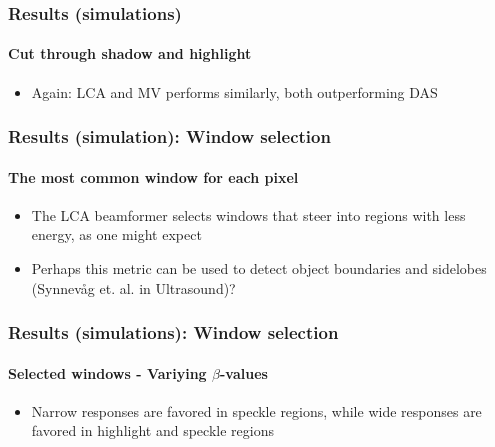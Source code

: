 \documentclass[
    beamer                                       %
 , xelatex                                      %
]{common/mytemplate}
\begin{document}
\begin{frame}
\frametitle{Results (simulations)}
\framesubtitle{Cut through shadow and highlight}
\parbox{0.55\linewidth}{
\begin{itemize}
\item Again: LCA and MV performs similarly, both outperforming DAS
\end{itemize}}
\vspace{-67pt}
\begin{figure}[H]
\end{figure}
\end{frame}

\begin{frame}
\frametitle{Results (simulation): Window selection}
\framesubtitle{The most common window for each pixel}
\vspace{-5pt}
\begin{figure}[H]
\end{figure}
\begin{itemize}
\item The LCA beamformer selects windows that steer into regions with less energy, as one might expect
\item Perhaps this metric can be used to detect object boundaries and sidelobes (Synnevåg et. al. in Ultrasound)? 
\end{itemize}
\end{frame}



\begin{frame}
\frametitle{Results (simulations): Window selection}
\framesubtitle{Selected windows - Variying $\beta$-values}
\vspace{-5pt}
\begin{figure}[H]
\end{figure}
\begin{itemize}
\item Narrow responses are favored in speckle regions, while wide responses are favored in highlight and speckle regions
\end{itemize}
\end{frame}
\end{document}
